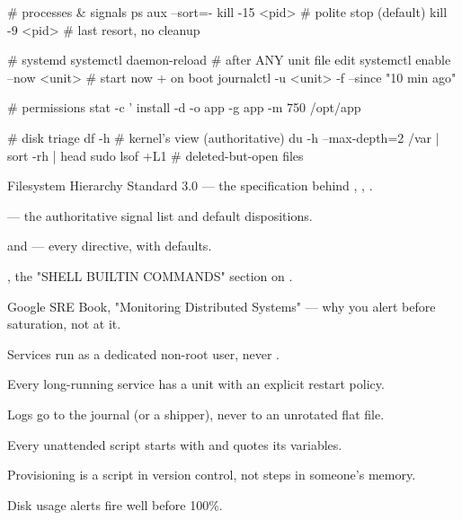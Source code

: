 \begin{bashbox}
# processes & signals
ps aux --sort=-%
kill -15 <pid>                        # polite stop (default)
kill -9 <pid>                         # last resort, no cleanup

# systemd
systemctl daemon-reload               # after ANY unit file edit
systemctl enable --now <unit>         # start now + on boot
journalctl -u <unit> -f --since "10 min ago"

# permissions
stat -c '%
install -d -o app -g app -m 750 /opt/app

# disk triage
df -h                                 # kernel's view (authoritative)
du -h --max-depth=2 /var | sort -rh | head
sudo lsof +L1                         # deleted-but-open files
\end{bashbox}

\begin{iqbox}
\end{iqbox}

\begin{wbitem}
  \item Filesystem Hierarchy Standard 3.0 --- the specification behind , , .
  \item {} --- the authoritative signal list and default dispositions.
  \item {} and  --- every directive, with defaults.
  \item {}, the "SHELL BUILTIN COMMANDS" section on .
  \item Google SRE Book, "Monitoring Distributed Systems" --- why you alert before saturation, not at it.
\end{wbitem}

\begin{checklist}
  \item Services run as a dedicated non-root user, never .
  \item Every long-running service has a unit with an explicit restart policy.
  \item Logs go to the journal (or a shipper), never to an unrotated flat file.
  \item Every unattended script starts with  and quotes its variables.
  \item Provisioning is a script in version control, not steps in someone's memory.
  \item Disk usage alerts fire well before 100\%.
\end{checklist}

